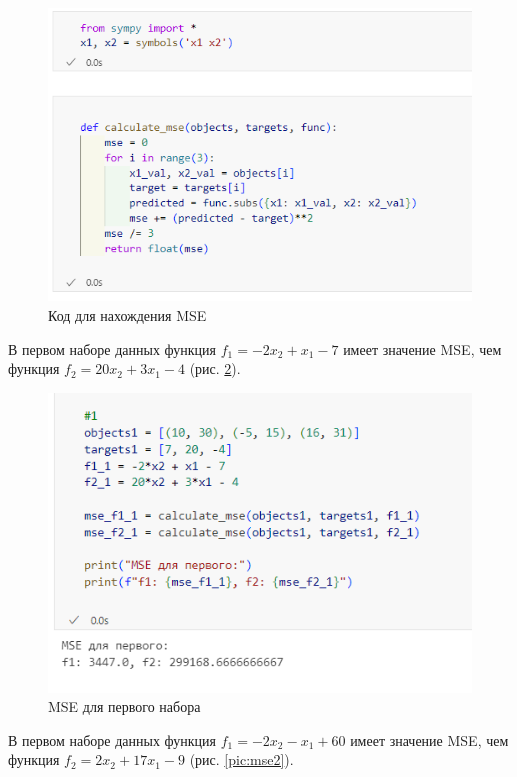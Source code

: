 \documentclass[14pt,a4paper]{extarticle}
\begin{document}
\begin{figure}[h!]
    \centering
    \includegraphics[scale=0.7]{pic6/1.png}
    \caption{Код для нахождения MSE}
    \label{pic:cod}
\end{figure}
\FloatBarrier

В первом наборе данных функция
$f_1=-2x_2+x_1-7$ имеет значение MSE, чем функция $f_2=20x_2+3x_1-4$ (рис. \ref{pic:mse1}).

\begin{figure}[h!]
    \centering
    \includegraphics[scale=0.9]{pic6/1.1.png}
    \caption{MSE для первого набора}
    \label{pic:mse1}
\end{figure}
\FloatBarrier

В первом наборе данных функция
$f_1=-2x_2-x_1+60$ имеет значение MSE, чем функция $f_2=2x_2+17x_1-9$ (рис. \ref{pic:mse2}).
\end{document}
